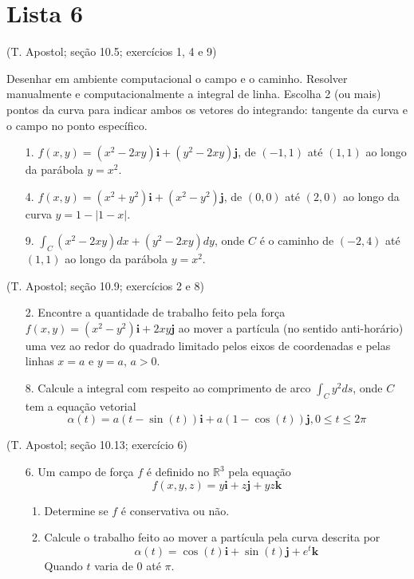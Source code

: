 \documentclass[../main.tex]{subfiles}
\begin{document}
	
	\section{Lista 6}
	\begin{exercicio}{1}
		(T. Apostol; seção 10.5; exercícios 1, 4 e 9)
		
		Desenhar em ambiente computacional o campo e o caminho. Resolver manualmente e computacionalmente a integral de linha. Escolha 2 (ou mais) pontos da curva para indicar ambos os vetores do integrando: tangente da curva e o campo no ponto específico.
		
		\begin{enumerate}
			\item[1.] $f(x,y)=(x^2-2xy)\textbf{i} + (y^2-2xy)\textbf{j}$, de $(-1,1)$ até $(1,1)$ ao longo da parábola $y=x^2$.
			\item[4.] $f(x,y)=(x^2+y^2)\textbf{i}+(x^2-y^2)\textbf{j}$, de $(0,0)$ até $(2,0)$ ao longo da curva $y=1-|1-x|$.
			\item[9.] $\int_C (x^2-2xy)dx+(y^2-2xy)dy$, onde $C$ é o caminho de $(-2,4)$ até $(1,1)$ ao longo da parábola $y=x^2$.   
		\end{enumerate}
	\end{exercicio}
	
	\begin{exercicio}{2}
		(T. Apostol; seção 10.9; exercícios 2 e 8)
		
		\begin{enumerate}
			\item[2.] Encontre a quantidade de trabalho feito pela força $f(x,y)=(x^2-y^2)\textbf{i}+2xy\textbf{j}$ ao mover a partícula (no sentido anti-horário) uma vez ao redor do quadrado limitado pelos eixos de coordenadas e pelas linhas $x=a$ e $y=a$, $a>0$.
			\item[8.] Calcule a integral com respeito ao comprimento de arco $\int_C y^2 ds$, onde $C$ tem a equação vetorial
			\[
			\alpha(t)=a(t-\sin(t))\textbf{i} + a(1-\cos(t))\textbf{j}, 0\leq t\leq 2\pi
			\]
		\end{enumerate}
	\end{exercicio}
	
	\begin{exercicio}{3}
		(T. Apostol; seção 10.13; exercício 6)
		\begin{enumerate}
			\item[6.] Um campo de força $f$ é definido no $\mathbb{R}^3$ pela equação
			\[
			f(x,y,z)=y\textbf{i} + z\textbf{j} +yz\textbf{k}
			\]
			\begin{enumerate}[label=\alph*)]
				\item Determine se $f$ é conservativa ou não.
				\item Calcule o trabalho feito ao mover a partícula pela curva descrita por
				\[
				\alpha(t)=\cos(t)\textbf{i}+\sin(t)\textbf{j}+e^t\textbf{k}
				\]
				Quando $t$ varia de $0$ até $\pi$.
			\end{enumerate}
		\end{enumerate}
	\end{exercicio}
	
\end{document}

